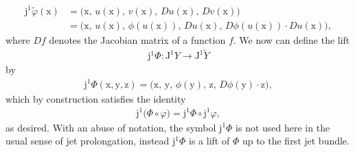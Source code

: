 \documentclass[12pt,a4paper,reqno]{article}
\begin{document}
\begin{align}
{\ensuremath{\mathrm{j}}}^{1} \tilde{\ensuremath{\varphi}} ({\ensuremath{{\ensuremath{\mathrm{{x}}}}}})
\nonumber
&= \big( {\ensuremath{{\ensuremath{\mathrm{{x}}}}}} , \, {\ensuremath{{\ensuremath{{u}}}}} ({\ensuremath{{\ensuremath{\mathrm{{x}}}}}}) , \, {\ensuremath{{\ensuremath{{v}}}}} ({\ensuremath{{\ensuremath{\mathrm{{x}}}}}})          , \, D {\ensuremath{{\ensuremath{{u}}}}} ({\ensuremath{{\ensuremath{\mathrm{{x}}}}}}) , \, D {\ensuremath{{\ensuremath{{v}}}}} ({\ensuremath{{\ensuremath{\mathrm{{x}}}}}}) \big) \\
&= \big( {\ensuremath{{\ensuremath{\mathrm{{x}}}}}} , \, {\ensuremath{{\ensuremath{{u}}}}} ({\ensuremath{{\ensuremath{\mathrm{{x}}}}}}) , \, \phi ( {\ensuremath{{\ensuremath{{u}}}}} ({\ensuremath{{\ensuremath{\mathrm{{x}}}}}}) ) , \, D {\ensuremath{{\ensuremath{{u}}}}} ({\ensuremath{{\ensuremath{\mathrm{{x}}}}}}) , \, D \phi ( {\ensuremath{{\ensuremath{{u}}}}} ({\ensuremath{{\ensuremath{\mathrm{{x}}}}}}) ) \cdot D {\ensuremath{{\ensuremath{{u}}}}} ({\ensuremath{{\ensuremath{\mathrm{{x}}}}}}) \big) ,
\end{align}
where $Df$ denotes the Jacobian matrix of a function $f$.
We now can define the lift
\begin{align}\label{eq:formal_lagrangians_embedding_lifted}
{\ensuremath{\mathrm{j}}}^{1} \Phi : {\ensuremath{\mathrm{J}}}^{1} Y \rightarrow {\ensuremath{\mathrm{J}}}^{1} \tilde{Y}
\end{align}
by
\begin{align}\label{eq:formal_lagrangians_embedding_lifted_2}
{\ensuremath{\mathrm{j}}}^{1} \Phi  \left( {\ensuremath{{\ensuremath{\mathrm{{x}}}}}}, {\ensuremath{{\ensuremath{\mathrm{{y}}}}}}, {\ensuremath{{\ensuremath{\mathrm{{z}}}}}} \right) = \big( {\ensuremath{{\ensuremath{\mathrm{{x}}}}}} , \, {\ensuremath{{\ensuremath{\mathrm{{y}}}}}} , \, \phi ( {\ensuremath{{\ensuremath{\mathrm{{y}}}}}} ) , \, {\ensuremath{{\ensuremath{\mathrm{{z}}}}}} , \, D \phi ({\ensuremath{{\ensuremath{\mathrm{{y}}}}}}) \cdot {\ensuremath{{\ensuremath{\mathrm{{z}}}}}} \big) ,
\end{align}
which by construction satisfies the identity
\begin{align}
{\ensuremath{\mathrm{j}}}^{1} \big( \Phi \circ {\ensuremath{\varphi}} \big) = {\ensuremath{\mathrm{j}}}^{1} \Phi \circ {\ensuremath{\mathrm{j}}}^{1} {\ensuremath{\varphi}} ,
\end{align}
as desired.
With an abuse of notation, the symbol ${\ensuremath{\mathrm{j}}}^{1} \Phi$ is not used here in the usual sense of jet prolongation, instead ${\ensuremath{\mathrm{j}}}^{1} \Phi$ is a lift of $\Phi$ up to the first jet bundle.
\end{document}
